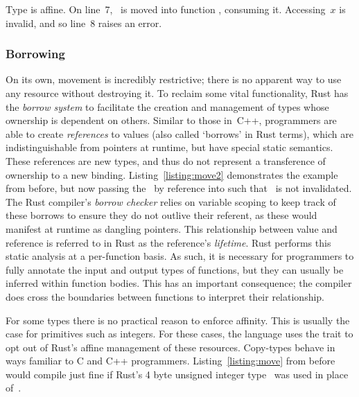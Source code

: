 \begin{listing}[ht]
	\centering
	\inputminted[]{rust}{move.rs}
	\caption[Example of move semantics in Rust.]{Type  is affine. On line~7, ~is moved into function , consuming it. Accessing~$x$ is invalid, and so line~8 raises an error.}
	\label{listing:move}
\end{listing}

\subsubsection{Borrowing}

On its own, movement is incredibly restrictive; there is no apparent way to use any resource without destroying it. To reclaim some vital functionality, Rust has the \textit{borrow system} to facilitate the creation and management of types whose ownership is dependent on others. Similar to those in~C++, programmers are able to create \textit{references} to values (also called `borrows' in Rust terms), which are indistinguishable from pointers at runtime, but have special static semantics. These references are new types, and thus do not represent a transference of ownership to a new binding. Listing~\ref{listing:move2} demonstrates the example from before, but now passing the~ by reference into  such that~ is not invalidated. The Rust compiler's \textit{borrow checker} relies on variable scoping to keep track of these borrows to ensure they do not outlive their referent, as these would manifest at runtime as dangling pointers. This relationship between value and reference is referred to in Rust as the reference's \textit{lifetime}. Rust performs this static analysis at a per-function basis. As such, it is necessary for programmers to fully annotate the input and output types of functions, but they can usually be inferred within function bodies. This has an important consequence; the compiler does cross the boundaries between functions to interpret their relationship. 

For some types there is no practical reason to enforce affinity. This is usually the case for primitives such as integers. For these cases, the language uses the  trait to opt out of Rust's affine management of these resources. Copy-types behave in ways familiar to C and C++ programmers. Listing~\ref{listing:move} from before would compile just fine if Rust's 4 byte unsigned integer type~ was used in place of~.

